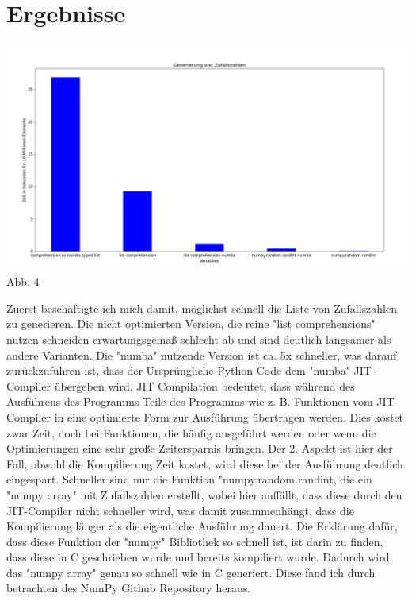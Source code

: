 \documentclass[12pt,a4paper]{article}
\begin{document}
\clearpage
\section{Ergebnisse}

\begin{center}
    \hspace*{-3cm}\includegraphics[width=1.4\textwidth]{./diagramme/matplotlib/zufallszahlen.png}
    Abb. 4
\end{center}

Zuerst beschäftigte ich mich damit, möglichst schnell die Liste von Zufallszahlen zu generieren.
Die nicht optimierten Version, die reine "list comprehensions" nutzen schneiden erwartungsgemäß schlecht ab
und sind deutlich langsamer als andere Varianten. Die "numba" nutzende Version ist ca. 5x schneller,
was darauf zurückzuführen ist, dass der Ursprüngliche Python Code dem "numba" JIT-Compiler übergeben wird.
JIT Compilation bedeutet, dass während des Ausführens des Programms Teile des Programms wie z. B. Funktionen
vom JIT-Compiler in eine optimierte Form zur Ausführung übertragen werden. Dies kostet zwar Zeit, doch bei
Funktionen, die häufig ausgeführt werden oder wenn die Optimierungen eine sehr große Zeitersparnis bringen.
Der 2. Aspekt ist hier der Fall, obwohl die Kompilierung Zeit kostet, wird diese bei der Ausführung deutlich eingespart.
Schneller sind nur die Funktion "numpy.random.randint, die ein "numpy array" mit Zufallszahlen erstellt,
wobei hier auffällt, dass diese durch den JIT-Compiler nicht schneller wird, was damit zusammenhängt, dass die Kompilierung
länger als die eigentliche Ausführung dauert. Die Erklärung dafür, dass diese Funktion der "numpy" Bibliothek
so schnell ist, ist darin zu finden, dass diese in C geschrieben wurde und bereits kompiliert wurde. Dadurch wird
das "numpy array" genau so schnell wie in C generiert. Diese fand ich durch betrachten des NumPy Github Repository heraus.
\end{document}
